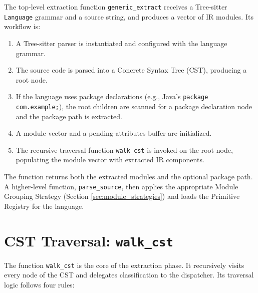 The top-level extraction function \texttt{generic\_extract} receives
a Tree-sitter \texttt{Language} grammar and a source string, and
produces a vector of IR modules. Its workflow is:
\begin{enumerate}
  \item A Tree-sitter parser is instantiated and configured with the
    language grammar.
  \item The source code is parsed into a Concrete Syntax Tree (CST),
    producing a root node.
  \item If the language uses package declarations (e.g., Java's
    \texttt{package com.example;}), the root children are scanned for
    a package declaration node and the package path is extracted.
  \item A module vector and a pending-attributes buffer are initialized.
  \item The recursive traversal function \texttt{walk\_cst} is
    invoked on the root node, populating the module vector with
    extracted IR components.
\end{enumerate}

The function returns both the extracted modules and the optional
package path. A higher-level function, \texttt{parse\_source}, then
applies the appropriate Module Grouping Strategy (Section
\ref{sec:module_strategies}) and loads the Primitive Registry for the language.

\section{CST Traversal: \texttt{walk\_cst}}
\label{sec:walk_cst}

The function \texttt{walk\_cst} is the core of the extraction phase.
It recursively visits every node of the CST and delegates
classification to the dispatcher. Its traversal logic follows four rules:

